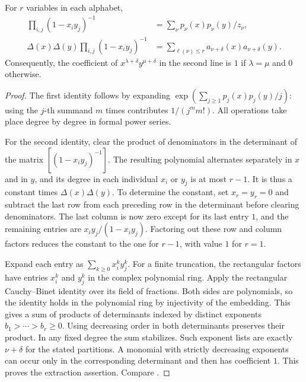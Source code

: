 \begin{lemma}\label{res:C02}
For \(r\) variables in each alphabet,
\begin{align*}
 \prod_{i,j}(1-x_i y_j)^{-1}
   &=\sum_\nu p_\nu(x)p_\nu(y)/z_\nu,\\
 \Delta(x)\Delta(y)\prod_{i,j}(1-x_i y_j)^{-1}
   &=\sum_{\ell(\nu)\le r}a_{\nu+\delta}(x)a_{\nu+\delta}(y).
\end{align*}
Consequently, the coefficient of \(x^{\lambda+\delta}y^{\mu+\delta}\)
in the second line is \(1\) if \(\lambda=\mu\) and \(0\) otherwise.
\end{lemma}

\begin{proof}
The first identity follows by expanding
\(\exp(\sum_{j\ge1}p_j(x)p_j(y)/j)\): using the \(j\)-th summand \(m\)
times contributes \(1/(j^m m!)\). All operations take place degree by
degree in formal power series.

For the second identity, clear the product of denominators in the
determinant of the matrix \([(1-x_i y_j)^{-1}]\).
The resulting polynomial alternates separately in \(x\) and in \(y\),
and its degree in each individual \(x_i\) or \(y_j\) is at most \(r-1\).
It is thus a constant times \(\Delta(x)\Delta(y)\). To determine the
constant, set \(x_r=y_r=0\) and subtract the last row from each preceding
row in the determinant before clearing denominators. The last column is
now zero except for its last entry \(1\), and the remaining entries are
\(x_i y_j/(1-x_i y_j)\). Factoring out these row and column factors
reduces the constant to the one for \(r-1\), with value \(1\) for \(r=1\).

Expand each entry as \(\sum_{k\ge0}x_i^k y_j^k\). For a finite truncation,
the rectangular factors have entries \(x_i^k\) and \(y_j^k\) in the
complex polynomial ring. Apply the rectangular Cauchy--Binet identity
over its field of fractions. Both sides are polynomials, so the
identity holds in the polynomial ring by injectivity of the embedding.
This gives a sum of products of determinants indexed by distinct
exponents \(b_1>\cdots>b_r\ge0\).
Using decreasing order in both determinants preserves their product.
In any fixed degree the sum stabilizes. Such exponent lists are
exactly \(\nu+\delta\) for the stated partitions. A monomial with
strictly decreasing exponents can occur only in the corresponding
determinant and then has coefficient \(1\). This proves the extraction
assertion. Compare \cite[Section 4.15]{etingof}.
\end{proof}

